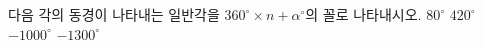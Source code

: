 다음 각의 동경이 나타내는 일반각을 $360^\circ\times n+\alpha^\circ$의 꼴로 나타내시오. 
 $80^\circ$
 $420^\circ$
 $-1000^\circ$
 $-1300^\circ$
